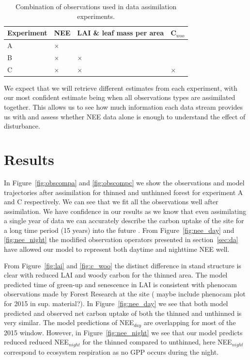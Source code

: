 \documentclass[draft,linenumbers]{agujournal}
\begin{document}
\begin{table}[ht] 
	\caption{Combination of observations used in data assimilation experiments.}
\begin{center}
	\begin{tabular}{| l | l | l | l |}
	\hline
	Experiment & NEE & LAI \& leaf mass per area & C\(_{woo}\) \\ \hline
	A & \(\times\) &  &  \\ \hline
	B & \(\times\) & \(\times\) &  \\ \hline
	C & \(\times\) & \(\times\) & \(\times\)  \\ \hline
	\end{tabular}
	\label{table:obs_da}
\end{center} 
\end{table}

We expect that we will retrieve different estimates from each experiment, with our most confident estimate being when all observations types are assimilated together. This allows us to see how much information each data stream provides us with and assess whether NEE data alone is enough to understand the effect of disturbance.

\section{Results} \label{sec:results}

In Figure~\ref{fig:obscompa} and \ref{fig:obscompc} we show the observations and model trajectories after assimilation for  thinned and unthinned forest for experiment A and C respectively. We can see that we fit all the observations well after assimilation. We have confidence in our results as we know that even assimilating a single year of data we can accurately describe the carbon uptake of the site for a long time period (15 years) into the future \citep{Pinnington2016299}. From Figure~\ref{fig:nee_day} and \ref{fig:nee_night} the modified observation operators presented in section~\ref{sec:da} have allowed our model to represent both daytime and nighttime NEE well. 

From Figure~\ref{fig:lai} and \ref{fig:c_woo} the distinct difference in stand structure is clear with reduced LAI and woody carbon for the thinned area. The model predicted time of green-up and senescence in LAI is consistent with phenocam observations made by Forest Research at the site ({\color{red} maybe include phenocam plot for 2015 in sup. material?}). In Figure~\ref{fig:nee_day} we see that both model predicted and observed net carbon uptake of both the thinned and unthinned is very similar. The model predictions of NEE\(_{day}\) are overlapping for most of the 2015 window. However, in Figure~\ref{fig:nee_night} we see that our model predicts reduced reduced NEE\(_{night}\) for the thinned compared to unthinned, here NEE\(_{night}\) correspond to ecosystem respiration as no GPP occurs during the night.    
\end{document}
